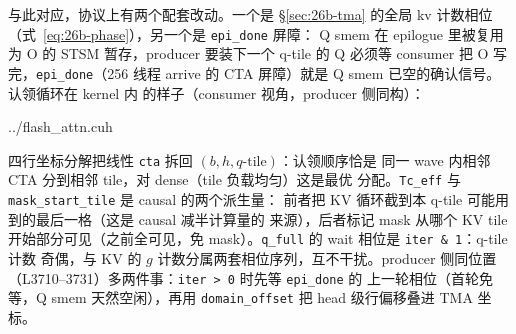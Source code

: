 与此对应，协议上有两个配套改动。一个是 \S\ref{sec:26b-tma} 的全局 kv 计数相位
（式~\eqref{eq:26b-phase}），另一个是 \texttt{epi\_\allowbreak{}done} 屏障：
Q smem 在 epilogue 里被复用为 O 的 STSM 暂存，producer 要装下一个 q-tile
的 Q 必须等 consumer 把 O 写完，\texttt{epi\_\allowbreak{}done}（256 线程
arrive 的 CTA 屏障）就是 Q smem 已空的确认信号。认领循环在 kernel 内
的样子（consumer 视角，producer 侧同构）：

\begin{lstinputlisting}[linerange={3853-3870},firstnumber=auto,
  title={flash\_attn.cuh L3853-3870（consumer：persistent 认领循环头与 per-tile 几何量）}]{../flash_attn.cuh}
\end{lstinputlisting}

四行坐标分解把线性 \texttt{cta} 拆回 $(b, h, q\text{-tile})$：认领顺序恰是
同一 wave 内相邻 CTA 分到相邻 tile，对 dense（tile 负载均匀）这是最优
分配。\texttt{Tc\_eff} 与 \texttt{mask\_start\_tile} 是 causal 的两个派生量：
前者把 KV 循环截到本 q-tile 可能用到的最后一格（这是 causal 减半计算量的
来源），后者标记 mask 从哪个 KV tile 开始部分可见（之前全可见，免
mask）。\texttt{q\_full} 的 wait 相位是 \texttt{iter \& 1}：q-tile 计数
奇偶，与 KV 的 $g$ 计数分属两套相位序列，互不干扰。producer 侧同位置
（L3710--3731）多两件事：\texttt{iter > 0} 时先等 \texttt{epi\_done} 的
上一轮相位（首轮免等，Q smem 天然空闲），再用 \texttt{domain\_\allowbreak{}offset}
把 head 级行偏移叠进 TMA 坐标。

